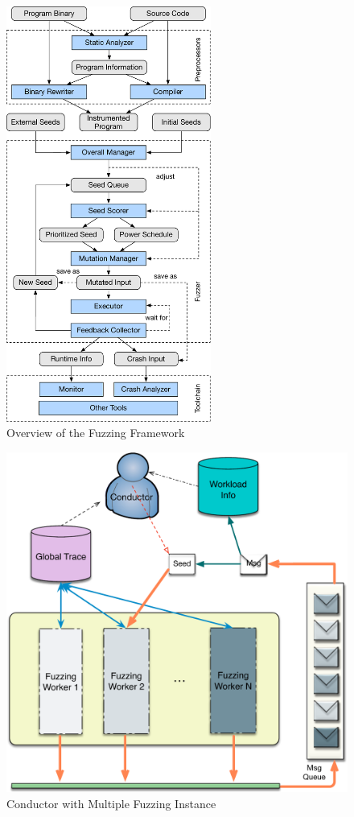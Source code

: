 \begin{figure}[t]
	\centering
	\includegraphics[width=0.6\textwidth]{res/fot/FOT_overview}
	\vspace{-5pt}
	\caption{Overview of the {\FOT} Fuzzing Framework}
	\label{fig:fot_workflow}
\end{figure}

\begin{figure}[t]
	\centering
	\includegraphics[width=0.6\columnwidth]{res/fot/mt_workflow}
	\caption{Conductor with Multiple Fuzzing Instance}
	\label{fig:mt_workflow}
\end{figure}


